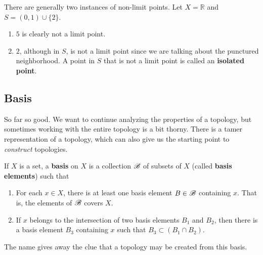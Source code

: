     \begin{example}
      There are generally two instances of non-limit points. Let $X = \mathbb{R}$ and $S = (0, 1) \cup \{2\}$. 
      \begin{enumerate}
        \item $5$ is clearly not a limit point. 
        \item $2$, although in $S$, is not a limit point since we are talking about the punctured neighborhood. A point in $S$ that is not a limit point is called an \textbf{isolated point}. 
      \end{enumerate}
    \end{example}

  \subsection{Basis} 

    So far so good. We want to continue analyzing the properties of a topology, but sometimes working with the entire topology is a bit thorny. There is a tamer representation of a topology, which can also give us the starting point to \textit{construct} topologies. 

    \begin{definition}[Basis]
      If $X$ is a set, a \textbf{basis} on $X$ is a collection $\B$ of subsets of $X$ (called \textbf{basis elements}) such that
      \begin{enumerate}
        \item For each $x \in X$, there is at least one basis element $B \in \B$ containing $x$. That is, the elements of $\B$ covers $X$. 
        \item If $x$ belongs to the intersection of two basis elements $B_1$ and $B_2$, then there is a basis element $B_3$ containing $x$ such that $B_3 \subset (B_1 \cap B_2)$. 
      \end{enumerate}
    \end{definition} 

    The name gives away the clue that a topology may be created from this basis.  

